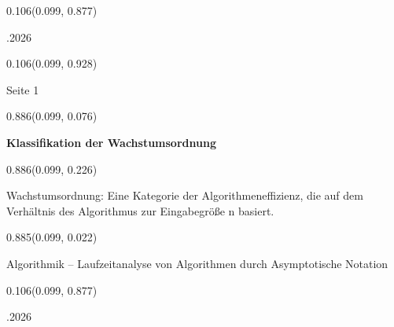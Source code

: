 \documentclass[aspectratio=169]{beamer}
\begin{document}
\begin{frame}[fragile]
  \begin{textblock}{0.106}(0.099, 0.877)
    \begin{minipage}[b][0.026\paperheight]{\linewidth}
      \raggedright
      \fontsize{3}{3.3}.2026
    \end{minipage}
  \end{textblock}

  \begin{textblock}{0.106}(0.099, 0.928)
    \begin{minipage}[b][0.031\paperheight]{\linewidth}
      \raggedright
      \fontsize{3}{3.3}\selectfont Seite 1
    \end{minipage}
  \end{textblock}
\end{frame}

\begin{frame}[fragile]
  \begin{textblock}{0.886}(0.099, 0.076)
    \begin{minipage}[t][0.131\paperheight]{\linewidth}
      \textbf{Klassifikation der Wachstumsordnung}
    \end{minipage}
  \end{textblock}

  \begin{textblock}{0.886}(0.099, 0.226)
    \begin{minipage}[t][0.63\paperheight]{\linewidth}
      Wachstumsordnung: Eine Kategorie der Algorithmeneffizienz, die auf dem Verhältnis des Algorithmus zur Eingabegröße n basiert.
    \end{minipage}
  \end{textblock}

  \begin{textblock}{0.885}(0.099, 0.022)
    \begin{minipage}[b][0.031\paperheight]{\linewidth}
      \raggedright
      \fontsize{3}{3.3}\selectfont Algorithmik – Laufzeitanalyse von Algorithmen durch Asymptotische Notation
    \end{minipage}
  \end{textblock}

  \begin{textblock}{0.106}(0.099, 0.877)
    \begin{minipage}[b][0.026\paperheight]{\linewidth}
      \raggedright
      \fontsize{3}{3.3}.2026
    \end{minipage}
  \end{textblock}


\end{frame}
\end{document}
